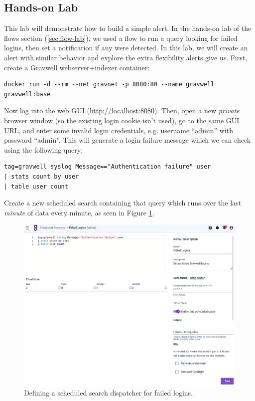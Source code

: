 \clearpage
\subsection{Hands-on Lab}
This lab will demonstrate how to build a simple alert. In the hands-on lab of the flows section (\ref{sec:flow-lab}), we used a flow to run a query looking for failed logins, then set a notification if any were detected. In this lab, we will create an alert with similar behavior and explore the extra flexibility alerts give us. First, create a Gravwell webserver+indexer container:

\begin{Verbatim}[breaklines=true]
docker run -d --rm --net gravnet -p 8080:80 --name gravwell gravwell:base
\end{Verbatim}

Now log into the web GUI (\href{http://localhost:8080}{http://localhost:8080}). Then, open a new \emph{private} browser window (so the existing login cookie isn't used), go to the same GUI URL, and enter some invalid login credentials, e.g. username ``admin'' with password ``admin''. This will generate a login failure message which we can check using the following query:

\begin{Verbatim}[breaklines=true]
tag=gravwell syslog Message=="Authentication failure" user 
| stats count by user 
| table user count
\end{Verbatim}

Create a new scheduled search containing that query which runs over the last \emph{minute} of data every minute, as seen in Figure \ref{fig:alert-lab-search}.

\begin{figure}
	\includegraphics[width=0.85\linewidth]{images/alert-lab-search.png}
	\caption{Defining a scheduled search dispatcher for failed logins.}
	\label{fig:alert-lab-search}
\end{figure}

